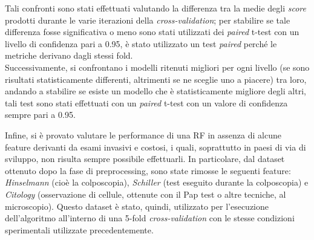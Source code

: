 Tali confronti sono stati effettuati valutando la differenza tra la medie degli \textit{score} prodotti durante le varie iterazioni della \textit{cross-validation}; per stabilire se tale differenza fosse significativa o meno sono stati utilizzati dei \textit{paired} t-test con un livello di confidenza pari a 0.95, è stato utilizzato un test \textit{paired} perché le metriche derivano dagli stessi fold.\\
Successivamente, si confrontano i modelli ritenuti migliori per ogni livello (se sono risultati statisticamente differenti, altrimenti se ne sceglie uno a piacere) tra loro, andando a stabilire se esiste un modello che è statisticamente migliore degli altri, tali test sono stati effettuati con un \textit{paired} t-test con un valore di confidenza sempre pari a 0.95.

Infine, si è provato valutare le performance di una RF in assenza di alcune feature derivanti da esami invasivi e costosi, i quali, soprattutto in paesi di via di sviluppo, non risulta sempre possibile effettuarli.
In particolare, dal dataset ottenuto dopo la fase di preprocessing, sono state rimosse le seguenti feature: \textit{Hinselmann} (cioè la colposcopia), \textit{Schiller} (test eseguito durante la colposcopia) e \textit{Citology} (osservazione di cellule, ottenute con il Pap test o altre tecniche, al microscopio).
Questo dataset è stato, quindi, utilizzato per l'esecuzione dell'algoritmo all'interno di una 5-fold \textit{cross-validation} con le stesse condizioni sperimentali utilizzate precedentemente.